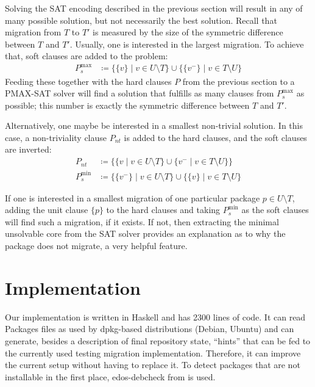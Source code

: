 \documentclass[halfparskip,11pt]{scrartcl}
\begin{document}
Solving the SAT encoding described in the previous section will result in any of many possible solution, but not necessarily the best solution. Recall that migration from $T$ to $T'$ is measured by the size of the symmetric difference between $T$ and $T'$. Usually, one is interested in the largest migration. To achieve that, soft clauses are added to the problem:
\begin{align*}
P_s^{\text{max}} &\coloneqq \{ \{v\} \mid v \in U\setminus T\} \cup \{ \{v^-\} \mid v \in T\setminus U\}
\end{align*}
Feeding these together with the hard clauses $P$ from the previous section to a PMAX-SAT solver will find a solution that fulfills as many clauses from $P_s^{\text{max}}$ as possible; this number is exactly the symmetric difference between $T$ and $T'$.

Alternatively, one maybe be interested in a smallest non-trivial solution. In this case, a non-triviality clause $P_{nt}$ is added to the hard clauses, and the soft clauses are inverted:
\begin{align*}
P_{nt} &\coloneqq \{ \{ v \mid v \in U\setminus T\} \cup \{v^- \mid v \in T\setminus U\} \} \\
P_s^{\text{min}} &\coloneqq \{ \{v^-\} \mid v \in U\setminus T\} \cup \{ \{v\} \mid v \in T\setminus U\}
\end{align*}

If one is interested in a smallest migration of one particular package $p\in U\setminus T$, adding the unit clause $\{p\}$ to the hard clauses and taking $P_s^{\text{min}}$ as the soft clauses will find such a migration, if it exists. If not, then extracting the minimal unsolvable core from the SAT solver provides an explanation as to why the package does not migrate, a very helpful feature.

\section{Implementation}

Our implementation is written in Haskell and has 2300 lines of code. It can read Packages files as used by dpkg-based distributions (Debian, Ubuntu) and can generate, besides a description of final repository state, “hints” that can be fed to the currently used testing migration implementation. Therefore, it can improve the current setup without having to replace it. To detect packages that are not installable in the first place, edos-debcheck from \cite{edos} is used.
\end{document}
